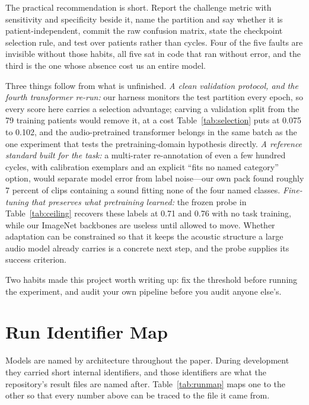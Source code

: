 \documentclass[journal,onecolumn]{IEEEtran}
\begin{document}
The practical recommendation is short. Report the challenge metric with sensitivity and
specificity beside it, name the partition and say whether it is patient-independent, commit the
raw confusion matrix, state the checkpoint selection rule, and test over patients rather than
cycles. Four of the five faults are invisible without those habits, all five sat in code that
ran without error, and the third is the one whose absence cost us an entire model.

Three things follow from what is unfinished. \emph{A clean validation protocol, and the fourth
transformer re-run:} our harness monitors the test partition every epoch, so every score here
carries a selection advantage; carving a validation split from the 79 training patients would
remove it, at a cost Table~\ref{tab:selection} puts at 0.075 to 0.102, and the audio-pretrained
transformer belongs in the same batch as the one experiment that tests the pretraining-domain
hypothesis directly. \emph{A reference standard built for the task:} a multi-rater re-annotation of even a few
hundred cycles, with calibration exemplars and an explicit ``fits no named category'' option,
would separate model error from label noise---our own pack found roughly 7 percent of clips
containing a sound fitting none of the four named classes.
\emph{Fine-tuning that preserves what pretraining learned:} the frozen probe in
Table~\ref{tab:ceiling} recovers these labels at 0.71 and 0.76 with no task training, while our
ImageNet backbones are useless until allowed to move. Whether adaptation can be constrained so
that it keeps the acoustic structure a large audio model already carries is a concrete next
step, and the probe supplies its success criterion.

Two habits made this project worth writing up: fix the threshold before running the experiment,
and audit your own pipeline before you audit anyone else's.

\appendices
\section{Run Identifier Map}
\label{app:runmap}

Models are named by architecture throughout the paper. During development they carried short
internal identifiers, and those identifiers are what the repository's result files are named
after. Table~\ref{tab:runmap} maps one to the other so that every number above can be traced to
the file it came from.
\end{document}
